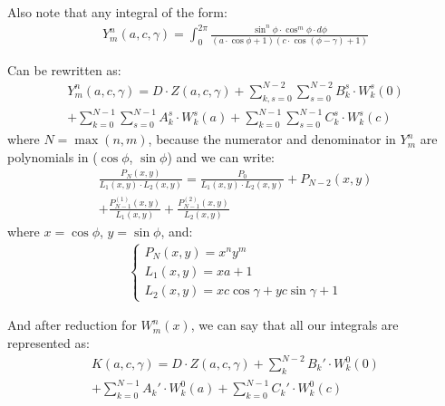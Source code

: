 Also note that any integral of the form:
\begin{equation}\begin{aligned}
Y^n_m(a, c, \gamma) = \int_{0}^{2 \pi} \frac{\sin^n \phi \cdot \cos^m \phi \cdot d \phi}{(a\cdot \cos \phi + 1)(c \cdot \cos (\phi - \gamma) + 1)}
\end{aligned}\end{equation}

Can be rewritten as:
\begin{equation}\begin{aligned}
Y^n_m(a, c, \gamma) = D\cdot Z(a,c,\gamma) + \sum_{k, s=0}^{N-2}\sum_{s=0}^{N-2} B_k^{s} \cdot W_k^s(0)  \\ + \sum_{k=0}^{N-1}\sum_{s=0}^{N-1} A_k^s \cdot W_k^s(a) + \sum_{k=0}^{N-1}\sum_{s=0}^{N-1} C_k^s \cdot W_k^s(c)
\end{aligned}\end{equation}
where $N = \max(n, m)$, because the numerator and denominator in $Y_m^n$ are polynomials in ($\cos \phi$, $\sin \phi$) and we can write:
\begin{equation}\begin{aligned}
\frac{P_N(x, y)}{L_1(x,y)\cdot L_2(x,y)} = \frac{P_0}{L_1(x,y)\cdot L_2(x,y)} + P_{N-2}(x,y) \\+ \frac{P_{N-1}^{(1)}(x,y)}{L_1(x,y)} + \frac{P_{N-1}^{(2)}(x,y)}{L_2(x,y)} 
\end{aligned}\end{equation}
where $x = \cos \phi$, $y = \sin \phi$, and: 
\begin{equation}\begin{aligned}
\begin{cases}
    P_N(x,y) = x^n y^m \\
    L_1(x,y) = xa + 1 \\
    L_2(x,y) = xc\cos \gamma  + yc\sin\gamma + 1
\end{cases}
\end{aligned}\end{equation}

And after reduction for $W_m^n(x)$, we can say that all our integrals are represented as:
\begin{equation}\begin{aligned}
K(a, c, \gamma) = D\cdot Z(a,c,\gamma) + \sum_{k}^{N-2} B_k' \cdot W_k^0(0)  \\ + \sum_{k=0}^{N-1} A_k' \cdot W_k^0(a) + \sum_{k=0}^{N-1} C_k' \cdot W_k^0(c)
\end{aligned}\end{equation}

